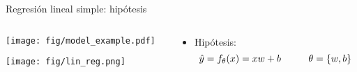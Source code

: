 \documentclass[aspectratio=169,9pt]{beamer}
\begin{document}
%
%			
%			


\begin{frame}{Regresión lineal simple: hipótesis}
\begin{columns}
	\begin{column}{0.55\textwidth}
		\begin{flushleft}
			\texttt{[image: fig/model\_example.pdf]}
		\end{flushleft}

			\texttt{[image: fig/lin\_reg.png]}
	\end{column}
	\begin{column}{0.45\textwidth}

			\begin{itemize}
				\item Hipótesis:
				\begin{equation*}
					\hat{y}=  f_\theta(x) = x  w+b    \hspace{10mm} \theta = \{w,b\} 
				\end{equation*}
			\end{itemize}

	\end{column}
\end{columns}
\end{frame}
\end{document}
